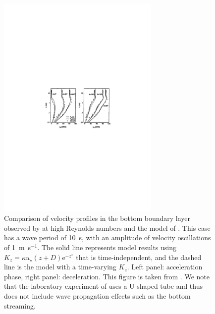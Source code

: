 \begin{figure}
\centerline{\includegraphics[width=0.7\textwidth]{FIGS_CH_BBL/wiberg_1top.pdf}}
  \caption{Comparison of velocity profiles in the bottom boundary layer observed by \cite{Jensen&al.1989} at high Reynolds numbers and the model of \cite{Wiberg1995}.
  This case has a wave period of 10~s, with an amplitude of velocity oscillations of  1~m~s$^{-1}$. 
  The solid line represents model results using  $K_z=\kappa u_\star (z+D) {\mathrm e}^{-z^\star}$ that is time-independent, and the dashed line is the model 
  with a time-varying  $K_z$. Left panel: acceleration phase, right panel: deceleration. This figure is taken from \cite{Wiberg1995}. We note that the laboratory experiment of \cite{Jensen&al.1989} uses a
  U-shaped tube and thus does not include wave propagation effects such as the bottom streaming.} \label{fig_Wiberg_top}
\end{figure}




